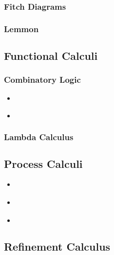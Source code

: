 \documentclass{article}
\begin{document}
\subsubsection{Fitch Diagrams}

 \cite{Fitch1952-FITSL}

\subsubsection{Lemmon}

 \cite{Lemmon1965-LEMBL}

\subsection{Functional Calculi}

\subsubsection{Combinatory Logic}

\begin{itemize}
\item {} \cite{bimbo2011combinatory}
\item {} \cite{Smullyan1985-SMUTMA-2}
\end{itemize}

\subsubsection{Lambda Calculus}

\subsection{Process Calculi}

\begin{itemize}
\item {} \cite{sangiorgi2003pi}
\item {} \cite{milner1999communicating}
\item {} \cite{Honda00secureinformation}
\end{itemize}

\subsection{Refinement Calculus}
\end{document}
